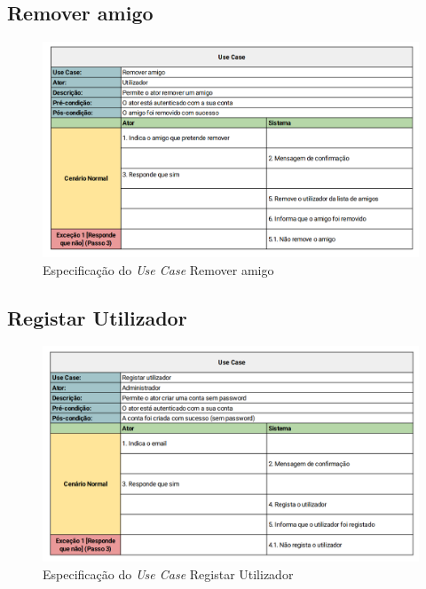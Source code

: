 \documentclass[a4paper]{report}
\begin{document}
\subsection{Remover amigo}
\begin{figure}[H]
	\centering 
    \includegraphics[width=\textwidth]{images/Remover_Amigo.png}  
    \caption{Especificação do \emph{Use Case} Remover amigo}
\end{figure}

\subsection{Registar Utilizador}
\begin{figure}[H]
	\centering 
    \includegraphics[width=\textwidth]{images/Criar_Conta.png}  
    \caption{Especificação do \emph{Use Case} Registar Utilizador}
\end{figure}
\end{document}
